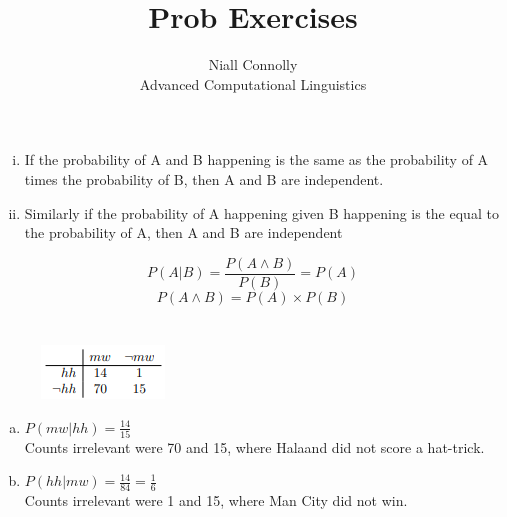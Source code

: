 \documentclass[12pt]{article}
\begin{document}
 
 
\title{Prob Exercises}
\author{Niall Connolly\\
Advanced Computational Linguistics}
 
\maketitle
 
\section{}

\begin{enumerate}[i)]
    \item If the probability of A and B happening is the same as the probability of A times the probability of B, then A and B are independent.
    \item Similarly if the probability of A happening given B happening is the equal to the probability of A, then A and B are independent
\end{enumerate}
\[
P(A | B) = \frac {P(A \wedge B)}{P(B)} = P(A)
\]
\[
P(A \wedge B) = P(A) \times P(B) 
\]

\section{}
\begin{figure}[h]
    \centering
    \includegraphics[width=0.25\linewidth]{Q2 Table.png}
\end{figure}

\begin{enumerate}[a)]
    \item $P(mw|hh)=\frac{14}{15}$\\ Counts irrelevant were 70 and 15, where Halaand did not score a hat-trick.
    \item $P(hh|mw)=\frac{14}{84}=\frac{1}{6}$\\Counts irrelevant were 1 and 15, where Man City did not win.
\end{enumerate}
\end{document}
